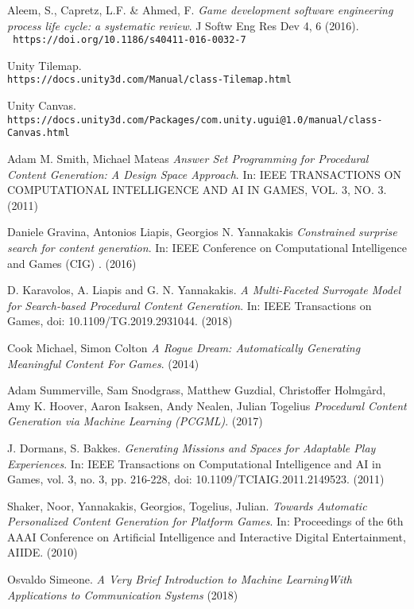 \begin{thebibliography}{9}
 Aleem, S., Capretz, L.F. \& Ahmed, F. \textit{Game development software engineering process life cycle: a systematic review}. J Softw Eng Res Dev 4, 6 (2016).\\
\texttt{ https://doi.org/10.1186/s40411-016-0032-7}

 Unity Tilemap.\\
\texttt{https://docs.unity3d.com/Manual/class-Tilemap.html}

 Unity Canvas.\\
\texttt{https://docs.unity3d.com/Packages/com.unity.ugui@1.0/manual/class-Canvas.html}

 Adam M. Smith, Michael Mateas \textit{Answer Set Programming for Procedural Content
Generation: A Design Space Approach}. In: IEEE TRANSACTIONS ON COMPUTATIONAL INTELLIGENCE AND AI IN GAMES, VOL. 3, NO. 3. (2011)

  Daniele Gravina, Antonios Liapis, Georgios N. Yannakakis  \textit{ Constrained surprise search for content generation}. In: IEEE Conference on Computational Intelligence and Games (CIG) . (2016)

  D. Karavolos, A. Liapis and G. N. Yannakakis. \textit{A Multi-Faceted Surrogate Model for Search-based Procedural Content Generation}. In: IEEE Transactions on Games, doi: 10.1109/TG.2019.2931044. (2018)

  Cook Michael,  Simon Colton \textit{A Rogue Dream: Automatically Generating Meaningful Content For Games}. (2014)

 Adam Summerville, Sam Snodgrass, Matthew Guzdial, Christoffer Holmgård, Amy K. Hoover, Aaron Isaksen, Andy Nealen, Julian Togelius \textit{Procedural Content Generation via Machine Learning (PCGML)}. (2017)

 J. Dormans, S. Bakkes. \textit{Generating Missions and Spaces for Adaptable Play Experiences}. In: IEEE Transactions on Computational Intelligence and AI in Games, vol. 3, no. 3, pp. 216-228, doi: 10.1109/TCIAIG.2011.2149523. (2011)

 Shaker, Noor, Yannakakis, Georgios, Togelius, Julian. \textit{Towards Automatic Personalized Content Generation for Platform Games}. In: Proceedings of the 6th AAAI Conference on Artificial Intelligence and Interactive Digital Entertainment, AIIDE. (2010)

 Osvaldo Simeone. \textit{A Very Brief Introduction to Machine LearningWith Applications to Communication Systems} (2018)


\end{thebibliography}
